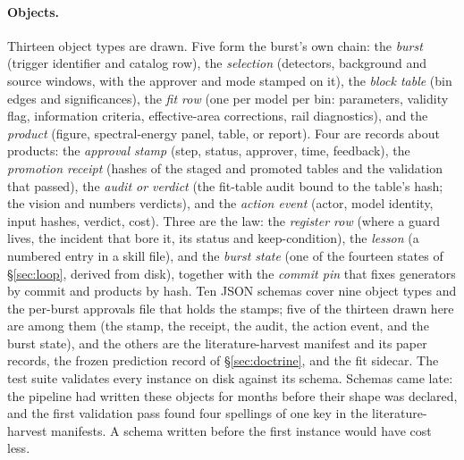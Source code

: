 \paragraph{Objects.} Thirteen object types are drawn. Five form the
burst's own chain: the \emph{burst} (trigger identifier and catalog row),
the \emph{selection} (detectors, background and source windows, with the
approver and mode stamped on it), the \emph{block table} (bin edges and
significances), the \emph{fit row} (one per model per bin: parameters,
validity flag, information criteria, effective-area corrections, rail
diagnostics), and the \emph{product} (figure, spectral-energy panel, table,
or report). Four are records about products: the \emph{approval stamp}
(step, status, approver, time, feedback), the \emph{promotion receipt}
(hashes of the staged and promoted tables and the validation that passed),
the \emph{audit or verdict} (the fit-table audit bound to the table's hash;
the vision and numbers verdicts), and the \emph{action event} (actor, model
identity, input hashes, verdict, cost). Three are the law: the
\emph{register row} (where a guard lives, the incident that bore it, its
status and keep-condition), the \emph{lesson} (a numbered entry in a skill
file), and the \emph{burst state} (one of the fourteen states of
\S\ref{sec:loop}, derived from disk), together with the \emph{commit pin}
that fixes generators by commit and products by hash. Ten JSON
schemas\prov{} cover nine object types and the per-burst approvals file
that holds the stamps; five of the thirteen drawn here are among them (the
stamp, the receipt, the audit, the action event, and the burst state), and
the others are the literature-harvest manifest and its paper records, the
frozen prediction record of \S\ref{sec:doctrine}, and the fit sidecar. The test suite validates every
instance on disk against its schema. Schemas came late: the pipeline had written
these objects for months before their shape was declared, and the first
validation pass found four spellings of one key in the literature-harvest
manifests. A schema written before the first instance would have cost less.

